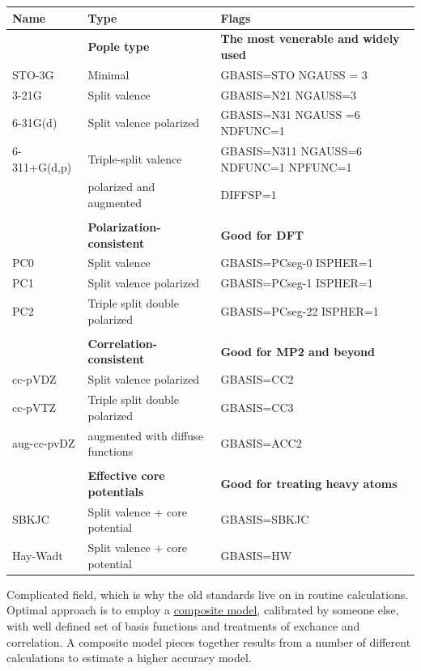 \documentclass[11pt]{article}
\begin{document}
\begin{center}
\begin{tabular}{lll}
\hline
Name & Type & Flags\\
\hline
 & \textbf{Pople type} & \textbf{The most venerable and widely used}\\
STO-3G & Minimal & GBASIS=STO  NGAUSS = 3\\
3-21G & Split valence & GBASIS=N21  NGAUSS=3\\
6-31G(d) & Split valence polarized & GBASIS=N31 NGAUSS =6 NDFUNC=1\\
6-311+G(d,p) & Triple-split valence & GBASIS=N311 NGAUSS=6 NDFUNC=1 NPFUNC=1\\
 & polarized and augmented & DIFFSP=1\\
 &  & \\
 & \textbf{Polarization-consistent} & \textbf{Good for DFT}\\
PC0 & Split valence & GBASIS=PCseg-0      ISPHER=1\\
PC1 & Split valence polarized & GBASIS=PCseg-1      ISPHER=1\\
PC2 & Triple split double polarized & GBASIS=PCseg-22     ISPHER=1\\
 &  & \\
 & \textbf{Correlation-consistent} & \textbf{Good for MP2 and beyond}\\
cc-pVDZ & Split valence polarized & GBASIS=CC2\\
cc-pVTZ & Triple split double polarized & GBASIS=CC3\\
aug-cc-pvDZ & augmented with diffuse functions & GBASIS=ACC2\\
 &  & \\
 & \textbf{Effective core potentials} & \textbf{Good for treating heavy atoms}\\
SBKJC & Split valence + core potential & GBASIS=SBKJC\\
Hay-Wadt & Split valence + core potential & GBASIS=HW\\
\hline
\end{tabular}
\end{center}

Complicated field, which is why the old standards live on in routine calculations.  Optimal approach is to employ a \uline{composite model}, calibrated by someone else, with well defined set of basis functions and treatments of exchance and correlation.  A composite model pieces together results from a number of different calculations to estimate a higher accuracy model.
\end{document}
